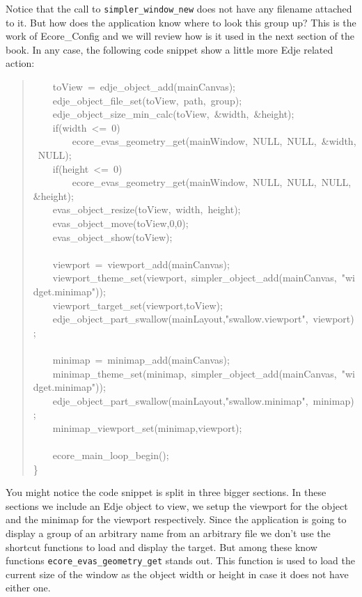 \documentclass[12pt,a4paper,english]{book}
\begin{document}
Notice that the call to \texttt{simpler{\_}window{\_}new} does not have any filename
attached to it. But how does the application know where to look this group up?
This is the work of Ecore{\_}Config and we will review how is it used in the next
section of the book. In any case, the following code snippet show a little more
Edje related action:
\begin{quote}{\ttfamily \raggedright \noindent
~~~~toView~=~edje{\_}object{\_}add(mainCanvas);~\\
~~~~edje{\_}object{\_}file{\_}set(toView,~path,~group);~\\
~~~~edje{\_}object{\_}size{\_}min{\_}calc(toView,~{\&}width,~{\&}height);~\\
~~~~if(width~<=~0)~\\
~~~~~~~~ecore{\_}evas{\_}geometry{\_}get(mainWindow,~NULL,~NULL,~{\&}width,~NULL);~\\
~~~~if(height~<=~0)~\\
~~~~~~~~ecore{\_}evas{\_}geometry{\_}get(mainWindow,~NULL,~NULL,~NULL,~{\&}height);~\\
~~~~evas{\_}object{\_}resize(toView,~width,~height);~\\
~~~~evas{\_}object{\_}move(toView,0,0);~\\
~~~~evas{\_}object{\_}show(toView);~\\
~\\
~~~~viewport~=~viewport{\_}add(mainCanvas);~\\
~~~~viewport{\_}theme{\_}set(viewport,~simpler{\_}object{\_}add(mainCanvas,~"widget.minimap"));~\\
~~~~viewport{\_}target{\_}set(viewport,toView);~\\
~~~~edje{\_}object{\_}part{\_}swallow(mainLayout,"swallow.viewport",~viewport);~\\
~\\
~~~~minimap~=~minimap{\_}add(mainCanvas);~\\
~~~~minimap{\_}theme{\_}set(minimap,~simpler{\_}object{\_}add(mainCanvas,~"widget.minimap"));~\\
~~~~edje{\_}object{\_}part{\_}swallow(mainLayout,"swallow.minimap",~minimap);~\\
~~~~minimap{\_}viewport{\_}set(minimap,viewport);~\\
~\\
~~~~ecore{\_}main{\_}loop{\_}begin();~\\
{\}}
}\end{quote}

You might notice the code snippet is split in three bigger sections. In
these sections we include an Edje object to view, we setup the viewport for the
object and the minimap for the viewport respectively. Since the application is
going to display a
group of an arbitrary name from an arbitrary file we don't use the shortcut
functions to load and display the target. But among these know functions
\texttt{ecore{\_}evas{\_}geometry{\_}get} stands out. This function is used to load the
current size of the window as the object width or height in case it does not
have either one.
\end{document}
